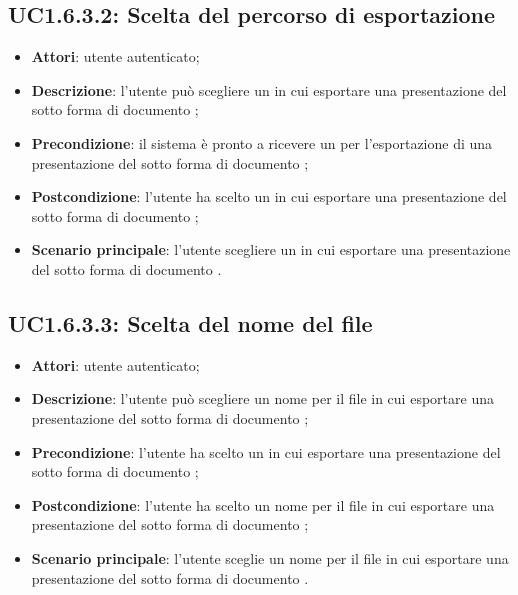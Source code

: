 \subsection{UC1.6.3.2: Scelta del percorso di esportazione}
\label{UC1.6.3.2}
\begin{itemize}
\item \textbf{Attori}: utente autenticato;
\item \textbf{Descrizione}: l'utente può scegliere un  in cui esportare una presentazione del  sotto forma di documento ;
\item \textbf{Precondizione}: il sistema è pronto a ricevere un  per l'esportazione di una presentazione del  sotto forma di documento ;
\item \textbf{Postcondizione}: l'utente ha scelto un  in cui esportare una presentazione del  sotto forma di documento ;
\item \textbf{Scenario principale}:
l'utente scegliere un  in cui esportare una presentazione del  sotto forma di documento .
\end{itemize}
\subsection{UC1.6.3.3: Scelta del nome del file}
\label{UC1.6.3.3}
\begin{itemize}
\item \textbf{Attori}: utente autenticato;
\item \textbf{Descrizione}: l'utente può scegliere un nome per il file in cui esportare una presentazione del  sotto forma di documento ;
\item \textbf{Precondizione}: l'utente ha scelto un  in cui esportare una presentazione del  sotto forma di documento ;
\item \textbf{Postcondizione}: l'utente ha scelto un nome per il file in cui esportare una presentazione del  sotto forma di documento ;
\item \textbf{Scenario principale}:
l'utente sceglie un nome per il file in cui esportare una presentazione del  sotto forma di documento .
\end{itemize}
